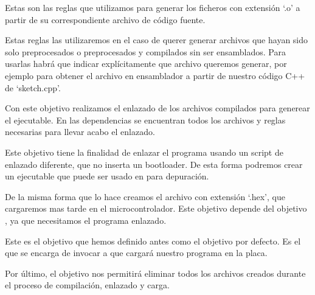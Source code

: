 
Estas son las reglas que utilizamos para generar los ficheros con extensión `.o' a partir de su correspondiente archivo de código fuente.


Estas reglas las utilizaremos en el caso de querer generar archivos que hayan sido solo preprocesados o preprocesados y compilados sin ser ensamblados. Para usarlas habrá que indicar explícitamente que archivo queremos generar, por ejemplo  para obtener el archivo en ensamblador a partir de nuestro código C++ de `sketch.cpp'.


Con este objetivo realizamos el enlazado de los archivos compilados para generear el ejecutable. En las dependencias se encuentran todos los archivos y reglas necesarias para llevar acabo el enlazado.


Este objetivo tiene la finalidad de enlazar el programa usando un script de enlazado diferente, que no inserta un bootloader. De esta forma podremos crear un ejecutable que puede ser usado en  para depuración.


De la misma forma que lo hace  creamos el archivo con extensión `.hex', que cargaremos mas tarde en el microcontrolador. Este objetivo depende del objetivo , ya que necesitamos el programa enlazado.


Este es el objetivo que hemos definido antes como el objetivo por defecto. Es el que se encarga de invocar a  que cargará nuestro programa en la placa.


Por último, el objetivo  nos permitirá eliminar todos los archivos creados durante el proceso de compilación, enlazado y carga.
